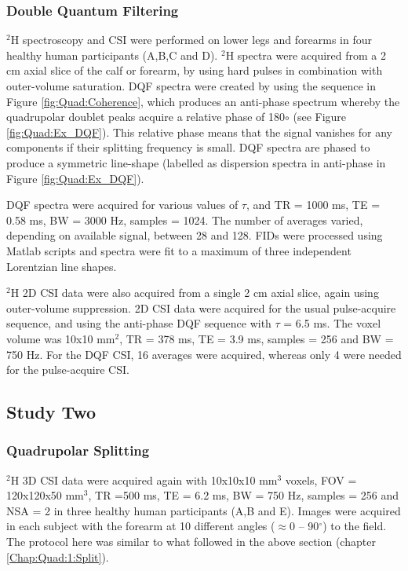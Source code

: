 \subsubsection{Double Quantum Filtering}
\label{Chap:Quad:1:DQF}

$^2$H spectroscopy and \ac{CSI} were performed on lower legs and forearms in four healthy human participants (A,B,C and D). $^2$H spectra were acquired from a 2 cm axial slice of the calf or forearm, by using hard pulses in combination with outer-volume saturation. \ac{DQF} spectra were created by using the sequence in Figure \ref{fig:Quad:Coherence}, which produces an anti-phase spectrum whereby the quadrupolar doublet peaks acquire a relative phase of 180$\circ$ (see Figure \ref{fig:Quad:Ex_DQF}). This relative phase means that the signal vanishes for any components if their splitting frequency is small. \ac{DQF} spectra are phased to produce a symmetric line-shape (labelled as dispersion spectra in anti-phase in Figure \ref{fig:Quad:Ex_DQF}).  

\ac{DQF} spectra were acquired for various values of $\tau$, and \ac{TR} = 1000 ms, \ac{TE} = 0.58 ms, \ac{BW} = 3000 Hz, samples = 1024. The number of averages varied, depending on available signal, between 28 and 128. \ac{FID}s were processed using Matlab scripts and spectra were fit to a maximum of three independent Lorentzian line shapes.

$^2$H 2D \ac{CSI} data were also acquired from a single 2 cm axial slice, again using outer-volume suppression. 2D \ac{CSI} data were acquired for the usual pulse-acquire sequence, and using the anti-phase \ac{DQF} sequence with $\tau$ = 6.5 ms. The voxel volume was 10x10 mm$^2$, \ac{TR} = 378 ms, \ac{TE} = 3.9 ms, samples = 256 and \ac{BW} = 750 Hz. For the \ac{DQF} \ac{CSI}, 16 averages were acquired, whereas only 4 were needed for the pulse-acquire \ac{CSI}.

\subsection{Study Two}
\subsubsection{Quadrupolar Splitting}

$^2$H 3D \ac{CSI} data were acquired again with 10x10x10 mm$^3$ voxels, \ac{FOV} = 120x120x50 mm$^3$, \ac{TR} =500 ms, \ac{TE} = 6.2 ms, \ac{BW} = 750 Hz, samples = 256 and NSA = 2 in three healthy human participants (A,B and E). Images were acquired in each subject with the forearm at 10 different angles ($\approx$0 – 90$^\circ$) to the field. The protocol here was similar to what followed in the above section (chapter \ref{Chap:Quad:1:Split}). 

